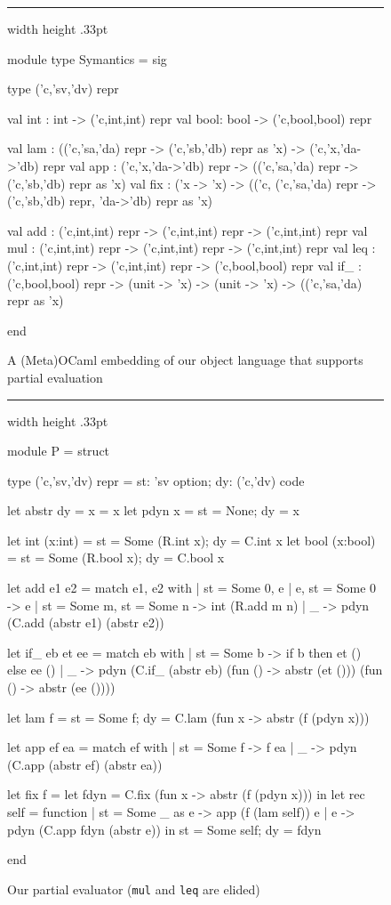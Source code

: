 \documentclass[preprint]{sigplanconf}
\newenvironment{floatrule}
    {\hrule width \hsize height .33pt \vspace{.5pc}}
    {\par\addvspace{1ex}}
\begin{document}
\begin{figure*}
\begin{floatrule}
\begin{code}
module type Symantics = sig

  type ('c,'sv,'dv) repr

  val int : int  -> ('c,int,int) repr
  val bool: bool -> ('c,bool,bool) repr

  val lam : (('c,'sa,'da) repr -> ('c,'sb,'db) repr as 'x) -> ('c,'x,'da->'db) repr
  val app : ('c,'x,'da->'db) repr -> (('c,'sa,'da) repr -> ('c,'sb,'db) repr as 'x)
  val fix : ('x -> 'x) -> (('c, ('c,'sa,'da) repr -> ('c,'sb,'db) repr, 'da->'db) repr as 'x)

  val add : ('c,int,int) repr -> ('c,int,int) repr -> ('c,int,int) repr
  val mul : ('c,int,int) repr -> ('c,int,int) repr -> ('c,int,int) repr
  val leq : ('c,int,int) repr -> ('c,int,int) repr -> ('c,bool,bool) repr
  val if_ : ('c,bool,bool) repr -> (unit -> 'x) -> (unit -> 'x) -> (('c,'sa,'da) repr as 'x)

end
\end{code}
\end{floatrule}
\caption{A (Meta)OCaml embedding of our object language that supports partial evaluation}
\label{fig:ocaml}
\end{figure*}

\begin{figure}
\begin{floatrule}
\begin{code}
module P = struct

  type ('c,'sv,'dv) repr = {st: 'sv option;
                            dy: ('c,'dv) code}

  let abstr {dy = x} = x
  let pdyn x = {st = None; dy = x}

  let int  (x:int)  = {st = Some (R.int x);
                       dy = C.int x}
  let bool (x:bool) = {st = Some (R.bool x);
                       dy = C.bool x}

  let add e1 e2 = match e1, e2 with
  | {st = Some 0}, e | e, {st = Some 0} -> e
  | {st = Some m}, {st = Some n} -> int (R.add m n)
  | _ -> pdyn (C.add (abstr e1) (abstr e2))

  let if_ eb et ee = match eb with
  | {st = Some b} -> if b then et () else ee ()
  | _ -> pdyn (C.if_ (abstr eb) 
                     (fun () -> abstr (et ()))
                     (fun () -> abstr (ee ())))

  let lam f =
  {st = Some f; 
   dy = C.lam (fun x -> abstr (f (pdyn x)))}

  let app ef ea = match ef with
  | {st = Some f} -> f ea
  | _ -> pdyn (C.app (abstr ef) (abstr ea))

  let fix f = 
    let fdyn = C.fix (fun x -> abstr (f (pdyn x)))
    in let rec self = function
       | {st = Some _} as e -> app (f (lam self)) e
       | e -> pdyn (C.app fdyn (abstr e))
       in {st = Some self; dy = fdyn}

end
\end{code}
\end{floatrule}
\caption{Our partial evaluator (\texttt{mul} and \texttt{leq} are elided)}
\label{fig:pe}
\end{figure}
\end{document}
